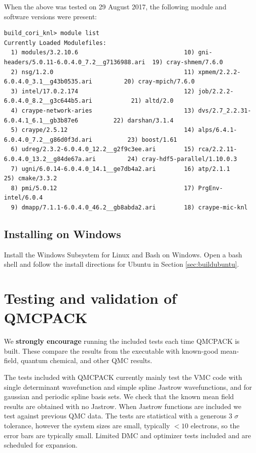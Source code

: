 When the above was tested on 29 August 2017, the following module and
software versions were present:

\begin{verbatim}
build_cori_knl> module list
Currently Loaded Modulefiles:
  1) modules/3.2.10.6                              10) gni-headers/5.0.11-6.0.4.0_7.2__g7136988.ari  19) cray-shmem/7.6.0
  2) nsg/1.2.0                                     11) xpmem/2.2.2-6.0.4.0_3.1__g43b0535.ari         20) cray-mpich/7.6.0
  3) intel/17.0.2.174                              12) job/2.2.2-6.0.4.0_8.2__g3c644b5.ari           21) altd/2.0
  4) craype-network-aries                          13) dvs/2.7_2.2.31-6.0.4.1_6.1__gb3b87e6          22) darshan/3.1.4
  5) craype/2.5.12                                 14) alps/6.4.1-6.0.4.0_7.2__g86d0f3d.ari          23) boost/1.61
  6) udreg/2.3.2-6.0.4.0_12.2__g2f9c3ee.ari        15) rca/2.2.11-6.0.4.0_13.2__g84de67a.ari         24) cray-hdf5-parallel/1.10.0.3
  7) ugni/6.0.14-6.0.4.0_14.1__ge7db4a2.ari        16) atp/2.1.1                                     25) cmake/3.3.2
  8) pmi/5.0.12                                    17) PrgEnv-intel/6.0.4
  9) dmapp/7.1.1-6.0.4.0_46.2__gb8abda2.ari        18) craype-mic-knl
\end{verbatim}

\subsection{Installing on Windows}
Install the Windows Subsystem for Linux and Bash on Windows.
Open a bash shell and follow the install directions for Ubuntu in Section \ref{sec:buildubuntu}.

\section{Testing and validation of QMCPACK}
\label{sec:testing}
We \textbf{strongly encourage} running the included tests each time
QMCPACK is built. These compare the results from the executable with
known-good mean-field, quantum chemical, and other QMC results.

The tests included with QMCPACK currently mainly test the VMC code with
single determinant wavefunction and simple spline Jastrow
wavefunctions, and for gaussian and periodic spline basis
sets. We check that the known mean
field results are obtained with no Jastrow. When Jastrow functions are
included we test against previous QMC data. The tests are statistical
with a generous 3 $\sigma$ tolerance, however the system sizes are
small, typically $<10$ electrons, so the error bars are typically
small. Limited DMC and optimizer tests included and are scheduled for expansion.

